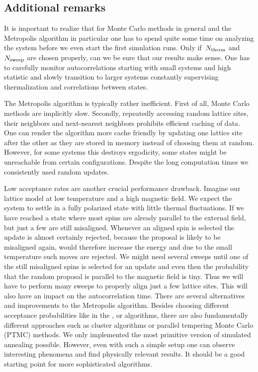 \subsection{Additional remarks}

It is important to realize that for Monte Carlo methods in general and the
Metropolis algorithm in particular one has to spend quite some time on analyzing
the system before we even start the first simulation runs. Only if~$N_{\mathrm{therm}}$
and~$N_{\mathrm{sweep}}$ are chosen properly, can we be sure that our results make sense.
One has to carefully monitor autocorrelations starting with small systems and
high statistic and slowly transition to larger systems constantly supervising
thermalization and correlations between states.

The Metropolis algorithm is typically rather inefficient. First of all, Monte
Carlo methods are implicitly slow. Secondly, repeatedly accessing random lattice
sites, their neighbors and next-nearest neighbors prohibits efficient caching of
data. One can render the algorithm more cache friendly by updating one lattice
site after the other as they are stored in memory instead of choosing them at
random. However, for some systems this destroys ergodicity, \ie{} some states
might be unreachable from certain configurations. Despite the long computation
times we consistently used random updates.

Low acceptance rates are another crucial performance drawback. Imagine our
lattice model at low temperature and a high magnetic field. We expect the system
to settle in a fully polarized state with little thermal fluctuations. If we
have reached a state where most spins are already parallel to the external
field, but just a few are still misaligned. Whenever an aligned spin is selected
the update is almost certainly rejected, because the proposal is likely to be
misaligned again, would therefore increase the energy and due to the small
temperature such moves are rejected. We might need several sweeps until one of
the still misaligned spins is selected for an update and even then the
probability that the random proposal is parallel to the magnetic field is tiny.
Thus we will have to perform many sweeps to properly align just a few lattice
sites. This will also have an impact on the autocorrelation time. There are
several alternatives and improvements to the Metropolis algorithm. Besides
choosing different acceptance probabilities like in the ,
 or  algorithms, there are also
fundamentally different approaches such as cluster algorithms or parallel
tempering Monte Carlo (PTMC) methods. We only implemented the most primitive
version of simulated annealing possible. However, even with such a simple setup
one can observe interesting phenomena and find physically relevant results. It
should be a good starting point for more sophisticated algorithms.

